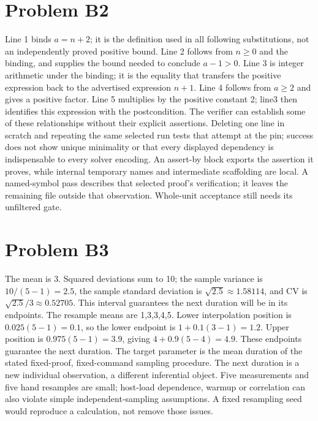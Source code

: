 \documentclass[11pt]{article}
\begin{document}
\section*{Problem B2}\label{ans:B2}
\begin{answer}
Line 1 binds $a=n+2$; it is the definition used in all following substitutions,
not an independently proved positive bound. Line 2 follows from $n\geq0$ and
the binding, and supplies the bound needed to conclude $a-1>0$. Line 3 is
integer arithmetic under the binding; it is the equality that transfers the
positive expression back to the advertised expression $n+1$. Line 4 follows
from $a\geq2$ and gives a positive factor. Line 5 multiplies by the positive
constant 2; line3 then identifies this expression with the postcondition.
The verifier can establish some of these relationships without their explicit
assertions. Deleting one line in scratch and repeating the same selected run
tests that attempt at the pin; success does not show unique minimality or that
every displayed dependency is indispensable to every solver encoding.
An assert-by block exports the assertion it proves, while internal temporary
names and intermediate scaffolding are local. A named-symbol pass describes
that selected proof's verification; it leaves the remaining file outside
that observation. Whole-unit acceptance still needs its unfiltered gate.
\end{answer}
\section*{Problem B3}\label{ans:B3}
\begin{answer}
The mean is 3. Squared deviations sum to 10; the sample variance is
$10/(5-1)=2.5$, the sample standard deviation is $\sqrt{2.5}\approx1.58114$,
and CV is $\sqrt{2.5}/3\approx0.52705$. This interval guarantees the next duration will be in its endpoints.
The resample means are 1,3,3,4,5. Lower interpolation position is
$0.025(5-1)=0.1$, so the lower endpoint is $1+0.1(3-1)=1.2$.
Upper position is $0.975(5-1)=3.9$, giving $4+0.9(5-4)=4.9$.
These endpoints guarantee the next duration. The target parameter is the mean
duration of the stated fixed-proof, fixed-command sampling procedure. The
next duration is a new individual observation, a different inferential object.
Five measurements and five hand resamples are small; host-load dependence,
warmup or correlation can also violate simple independent-sampling assumptions.
A fixed resampling seed would reproduce a calculation, not remove those issues.
\end{answer}
\end{document}
